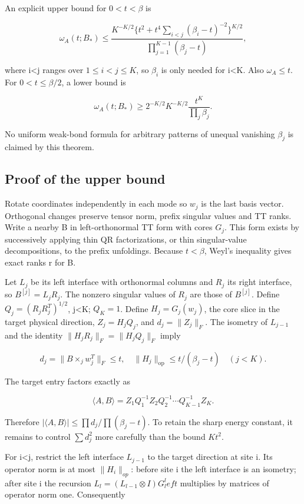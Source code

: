 \documentclass[
  11pt,
]{article}
\begin{document}
An explicit upper bound for \(0<t<\beta\) is

\[
 \omega_A(t;B_*)\le
 \frac{K^{-K/2}\{t^2+t^4\sum_{i<j}(\beta_i-t)^{-2}\}^{K/2}}
      {\prod_{j=1}^{K-1}(\beta_j-t)}, \tag{G2}
\]

where i\textless j ranges over \(1\le i<j\le K\), so \(\beta _i\) is
only needed for i\textless K. Also \(\omega _A\le t\). For
\(0<t\le \beta /2\), a lower bound is

\[
 \omega_A(t;B_*)\ge
 2^{-K/2}K^{-K/2}\frac{t^K}{\prod_j\beta_j}. \tag{G3}
\]

No uniform weak-bond formula for arbitrary patterns of unequal vanishing
\(\beta _j\) is claimed by this theorem.

\subsection{Proof of the upper bound}\label{proof-of-the-upper-bound}

Rotate coordinates independently in each mode so \(w_j\) is the last
basis vector. Orthogonal changes preserve tensor norm, prefix singular
values and TT ranks. Write a nearby B in left-orthonormal TT form with
cores \(G_j\). This form exists by successively applying thin QR
factorizations, or thin singular-value decompositions, to the prefix
unfoldings. Because \(t<\beta\), Weyl's inequality gives exact ranks r
for B.

Let \(L_j\) be its left interface with orthonormal columns and \(R_j\)
its right interface, so \(B^{[j]}=L_jR_j\). The nonzero singular values
of \(R_j\) are those of \(B^{[j]}\). Define \(Q_j=(R_jR_j^T)^{1/2}\),
j\textless K; \(Q_K=1\). Define \(H_j=G_j(w_j)\), the core slice in the
target physical direction, \(Z_j=H_jQ_j\), and \(d_j=\|Z_j\|_F\). The
isometry of \(L_{j-1}\) and the identity \(\|H_jR_j\|_F=\|H_jQ_j\|_F\)
imply

\[
 d_j=\|B\times_jw_j^T\|_F\le t,
 \quad\|H_j\|_{\mathrm{op}}\le t/(\beta_j-t)\quad(j<K).
\]

The target entry factors exactly as

\[
 \langle A,B\rangle
 =Z_1Q_1^{-1}Z_2Q_2^{-1}\cdots Q_{K-1}^{-1}Z_K.
\]

Therefore \(|\langle A,B\rangle |\le \prod d_j/\prod (\beta _j-t)\). To
retain the sharp energy constant, it remains to control \(\sum d_j^{2}\)
more carefully than the bound \(Kt^{2}\).

For i\textless j, restrict the left interface \(L_{j-1}\) to the target
direction at site i. Its operator norm is at most \(\|H_i\|_{op}\):
before site i the left interface is an isometry; after site i the
recursion \(L_l=(L_{l-1}\otimes I)G_l^left\) multiplies by matrices of
operator norm one. Consequently
\end{document}

